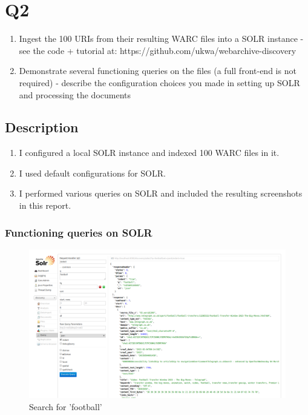 


\section{Q2}
\label{part2}
\begin{enumerate}

\item Ingest the 100 URIs from their resulting WARC files into a SOLR instance
	- see the code + tutorial at: https://github.com/ukwa/webarchive-discovery 

\item Demonstrate several functioning queries on the files (a full front-end is not required)
	- describe the configuration choices you made in setting up SOLR and processing the documents

\end{enumerate}

\subsection{Description}
\begin{enumerate}

\item I configured a local SOLR instance and indexed 100 WARC files in it.

\item I used default configurations for SOLR.

\item I performed various queries on SOLR and included the resulting screenshots in this report.

\end{enumerate}

\newpage


\subsubsection{Functioning queries on SOLR}


\begin{figure}[ht]    
    \begin{center}
        \includegraphics[width=\paperwidth]{query1.png}
        \caption{Search for 'football'}        
    \end{center}
\end{figure}

